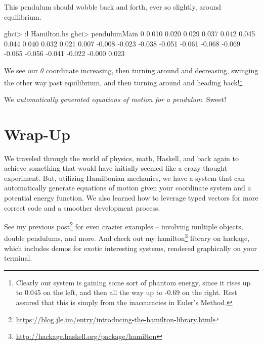 \documentclass[]{article}
\newenvironment{Shaded}{}{}
\newcommand{\DecValTok}[1]{\textcolor[rgb]{0.25,0.63,0.44}{#1}}
\newcommand{\FloatTok}[1]{\textcolor[rgb]{0.25,0.63,0.44}{#1}}
\newcommand{\NormalTok}[1]{#1}
\newcommand{\OperatorTok}[1]{\textcolor[rgb]{0.40,0.40,0.40}{#1}}
\renewcommand{\href}[2]{#2\footnote{\url{#1}}}
\begin{document}
This pendulum should wobble back and forth, ever so slightly, around
equilibrium.

\begin{Shaded}
\begin{Highlighting}[]
\NormalTok{ghci}\OperatorTok{>} \OperatorTok{:}\NormalTok{l Hamilton.hs}
\NormalTok{ghci}\OperatorTok{>}\NormalTok{ pendulumMain}
\DecValTok{0}
\FloatTok{0.010}
\FloatTok{0.020}
\FloatTok{0.029}
\FloatTok{0.037}
\FloatTok{0.042}
\FloatTok{0.045}
\FloatTok{0.044}
\FloatTok{0.040}
\FloatTok{0.032}
\FloatTok{0.021}
\FloatTok{0.007}
\OperatorTok{{-}}\FloatTok{0.008}
\OperatorTok{{-}}\FloatTok{0.023}
\OperatorTok{{-}}\FloatTok{0.038}
\OperatorTok{{-}}\FloatTok{0.051}
\OperatorTok{{-}}\FloatTok{0.061}
\OperatorTok{{-}}\FloatTok{0.068}
\OperatorTok{{-}}\FloatTok{0.069}
\OperatorTok{{-}}\FloatTok{0.065}
\OperatorTok{{-}}\FloatTok{0.056}
\OperatorTok{{-}}\FloatTok{0.041}
\OperatorTok{{-}}\FloatTok{0.022}
\OperatorTok{{-}}\FloatTok{0.000}
\FloatTok{0.023}
\end{Highlighting}
\end{Shaded}

We see our \(\theta\) coordinate increasing, then turning around and decreasing,
swinging the other way past equilibrium, and then turning around and heading
back!\footnote{Clearly our system is gaining some sort of phantom energy, since
  it rises up to 0.045 on the left, and then all the way up to -0.69 on the
  right. Rest assured that this is simply from the inaccuracies in Euler's
  Method.}

We \emph{automatically generated equations of motion for a pendulum}. Sweet!

\hypertarget{wrap-up}{%
\section{Wrap-Up}\label{wrap-up}}

We traveled through the world of physics, math, Haskell, and back again to
achieve something that would have initially seemed like a crazy thought
experiment. But, utilizing Hamiltonian mechanics, we have a system that can
automatically generate equations of motion given your coordinate system and a
potential energy function. We also learned how to leverage typed vectors for
more correct code and a smoother development process.

See my
\href{https://blog.jle.im/entry/introducing-the-hamilton-library.html}{previous
post} for even crazier examples -- involving multiple objects, double pendulums,
and more. And check out my
\href{http://hackage.haskell.org/package/hamilton}{hamilton} library on hackage,
which includes demos for exotic interesting systems, rendered graphically on
your terminal.
\end{document}
